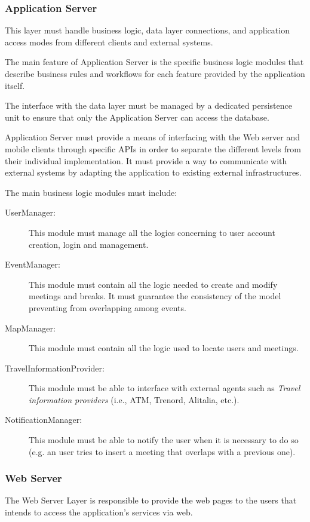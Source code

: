 \documentclass{article}
\begin{document}
	\subsubsection{Application Server}
	This layer must handle business logic, data layer connections, and application access modes from different clients and external systems.
	
	The main feature of Application Server is the specific business logic modules that describe business rules and workflows for each feature provided by the application itself.
	
	The interface with the data layer must be managed by a dedicated persistence unit to ensure that only the Application Server can access the database.
	
	\bigskip
	Application Server must provide a means of interfacing with the Web server and mobile clients through specific APIs in order to separate the different levels from their individual implementation. It must provide a way to communicate with external systems by adapting the application to existing external infrastructures.
	
	\bigskip
	The main business logic modules must include:

	\begin{description}
	\item[UserManager:] This module must manage all the logics concerning to user account creation, login and management.
	\item[EventManager:] This module must contain all the logic needed to create and modify meetings and breaks. It must guarantee the consistency of the model preventing from overlapping among events. 
	\item[MapManager:] This module must contain all the logic used to locate users and meetings. 
	\item[TravelInformationProvider:] This module must be able to interface with external agents such as \textit{Travel information providers} (i.e., ATM, Trenord, Alitalia, etc.).
	\item[NotificationManager:] This module must be able to notify the user when it is necessary to do so (e.g. an user tries to insert a meeting that overlaps with a previous one).
	\end{description}


	\subsubsection{Web Server}
	The Web Server Layer is responsible to provide the web pages to the users that intends to access the application's services via web.
	
\end{document}
